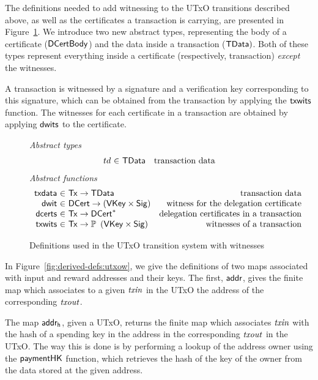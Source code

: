 \documentclass[11pt,a4paper,dvipsnames]{article}
\newcommand{\Tx}{\type{Tx}}
\newcommand{\DCert}{\type{DCert}}
\newcommand{\DCertBody}{\type{DCertBody}}
\newcommand{\TData}{\type{TData}}
\newcommand{\VKey}{\type{VKey}}
\newcommand{\Sig}{\type{Sig}}
\theoremstyle{definition}
\theoremstyle{definition}
\begin{document}
The definitions needed to add witnessing to the UTxO transitions described above,
as well as the certificates a transaction is carrying,
are presented in Figure~\ref{fig:defs:utxow}. We introduce two new abstract types,
representing the body of a certificate ($\DCertBody$) and the data inside a
transaction ($\TData)$. Both of these types represent everything inside a
certificate (respectively, transaction) \textit{except} the witnesses.

A transaction is witnessed by
a signature and a verification key corresponding to this signature, which can
be obtained from the transaction by applying the $\mathsf{txwits}$ function.
The witnesses for each certificate in a transaction are obtained by applying $\mathsf{dwits}$
to the certificate.

\begin{figure}
  \emph{Abstract types}
  \begin{equation*}
    \begin{array}{r@{~\in~}lr}
      td & \TData
      & \text{transaction data} \\
    \end{array}
  \end{equation*}
  \emph{Abstract functions}
  \begin{equation*}
    \begin{array}{r@{~\in~}lr}
      \fun{txdata} & \Tx \to \TData
      & \text{transaction data}\\
      \fun{dwit} & \DCert \to (\VKey \times \Sig)
      & \text{witness for the delegation certificate}\\
      \fun{dcerts} & \Tx \to \seqof{\DCert}
      & \text{delegation certificates in a transaction}\\
      \fun{txwits} & \Tx \to \powerset{\left(\VKey \times \Sig\right)}
      & \text{witnesses of a transaction}\\
    \end{array}
  \end{equation*}
  \caption{Definitions used in the UTxO transition system with witnesses}
  \label{fig:defs:utxow}
\end{figure}


In Figure~\ref{fig:derived-defs:utxow}, we give the definitions of two maps
associated with input and reward addresses and their keys.
The first, $\mathsf{addr}$, gives the finite map
which associates to a given $\mathit{txin}$ in the UTxO the address of the
corresponding $\mathit{txout}$.

The map $\mathsf{addr_h}$, given a UTxO, returns the
finite map which associates $\mathit{txin}$ with the hash of a spending key in
the address in the corresponding $\mathit{txout}$ in the UTxO. The way this is
done is by performing a lookup of the address owner using the
$\mathsf{paymentHK}$ function,
which retrieves the hash of the key of
the owner from the data stored at the given address.
\end{document}

